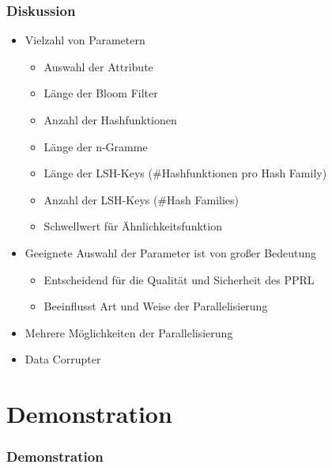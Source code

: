 \documentclass{beamer}
\begin{document}
    \begin{frame}
    		\frametitle{Diskussion}
    		\begin{itemize}
    			\item Vielzahl von Parametern
    			\begin{itemize}
    				\item Auswahl der Attribute
    				\item Länge der Bloom Filter
    				\item Anzahl der Hashfunktionen
    				\item Länge der n-Gramme
    				\item Länge der LSH-Keys (\#Hashfunktionen pro Hash Family)
    				\item Anzahl der LSH-Keys (\#Hash Families)
    				\item Schwellwert für Ähnlichkeitsfunktion
    			\end{itemize}
    			\item Geeignete Auswahl der Parameter ist von großer Bedeutung
    			\begin{itemize}
    				\item Entscheidend für die Qualität und Sicherheit des PPRL
    				\item Beeinflusst Art und Weise der Parallelisierung
    			\end{itemize}
    			\item Mehrere Möglichkeiten der Parallelisierung
                \item Data Corrupter
    		\end{itemize}
    \end{frame}
    
    \section[Section]{Demonstration}
    \begin{frame}
    		\frametitle{Demonstration}
    \end{frame}
        
\end{document}

